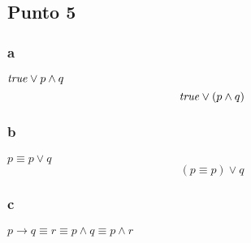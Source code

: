 \documentclass{article}
\begin{document}
\subsection{Punto 5}
\subsubsection{a}
\begin{logicenv}{$\textrm{\textit{true}} \lor p \land q$}
    \[\textrm{\textit{true}} \lor (p \land q)\]
\end{logicenv}

\subsubsection{b}
\begin{logicenv}{$p \equiv p \lor q$}
    \[(p \equiv p) \lor q\]
\end{logicenv}

\subsubsection{c}
\begin{logicenv}{$p \to q \equiv r \equiv p \land q \equiv p \land r$}
    
\end{logicenv}
\end{document}
